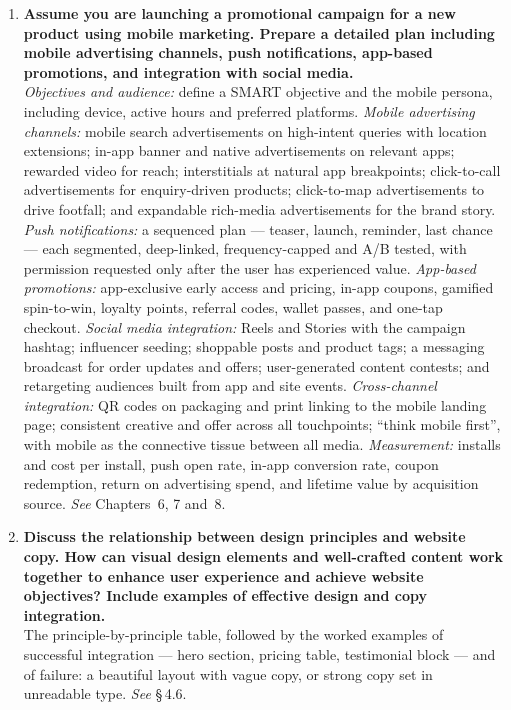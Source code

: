 \begin{enumerate}[leftmargin=2.2em,itemsep=1.4ex]
\item \textbf{Assume you are launching a promotional campaign for a new product
      using mobile marketing. Prepare a detailed plan including mobile advertising
      channels, push notifications, app-based promotions, and integration with
      social media.} \\
      \emph{Objectives and audience:} define a SMART objective and the mobile
      persona, including device, active hours and preferred platforms.
      \emph{Mobile advertising channels:} mobile search advertisements on
      high-intent queries with location extensions; in-app banner and native
      advertisements on relevant apps; rewarded video for reach; interstitials at
      natural app breakpoints; click-to-call advertisements for enquiry-driven
      products; click-to-map advertisements to drive footfall; and expandable
      rich-media advertisements for the brand story.
      \emph{Push notifications:} a sequenced plan --- teaser, launch, reminder,
      last chance --- each segmented, deep-linked, frequency-capped and A/B tested,
      with permission requested only after the user has experienced value.
      \emph{App-based promotions:} app-exclusive early access and pricing, in-app
      coupons, gamified spin-to-win, loyalty points, referral codes, wallet passes,
      and one-tap checkout.
      \emph{Social media integration:} Reels and Stories with the campaign
      hashtag; influencer seeding; shoppable posts and product tags; a messaging
      broadcast for order updates and offers; user-generated content contests; and
      retargeting audiences built from app and site events.
      \emph{Cross-channel integration:} QR codes on packaging and print linking to
      the mobile landing page; consistent creative and offer across all
      touchpoints; ``think mobile first'', with mobile as the connective tissue
      between all media.
      \emph{Measurement:} installs and cost per install, push open rate, in-app
      conversion rate, coupon redemption, return on advertising spend, and lifetime
      value by acquisition source. \hfill\emph{See} Chapters~6, 7 and~8.

\item \textbf{Discuss the relationship between design principles and website copy.
      How can visual design elements and well-crafted content work together to
      enhance user experience and achieve website objectives? Include examples of
      effective design and copy integration.}
      \\
      The principle-by-principle table, followed by the worked examples of
      successful integration --- hero section, pricing table, testimonial block ---
      and of failure: a beautiful layout with vague copy, or strong copy set in
      unreadable type. \hfill\emph{See} \S\,4.6.


\end{enumerate}
